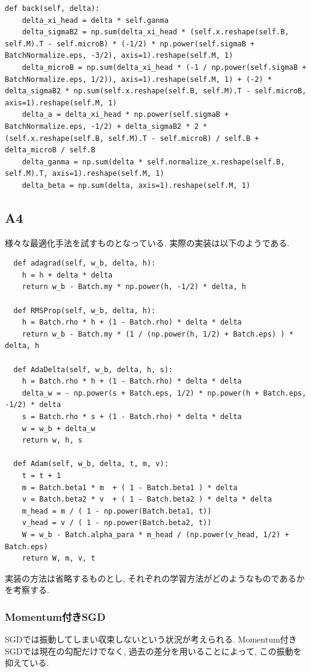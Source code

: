 \documentclass[a4paper,11pt]{jsarticle}
\begin{document}
\begin{lstlisting}[caption=Batch-Normalization-back]
  def back(self, delta):
    delta_xi_head = delta * self.ganma
    delta_sigmaB2 = np.sum(delta_xi_head * (self.x.reshape(self.B, self.M).T - self.microB) * (-1/2) * np.power(self.sigmaB + BatchNormalize.eps, -3/2), axis=1).reshape(self.M, 1)
    delta_microB = np.sum(delta_xi_head * (-1 / np.power(self.sigmaB + BatchNormalize.eps, 1/2)), axis=1).reshape(self.M, 1) + (-2) * delta_sigmaB2 * np.sum(self.x.reshape(self.B, self.M).T - self.microB, axis=1).reshape(self.M, 1)
    delta_a = delta_xi_head * np.power(self.sigmaB + BatchNormalize.eps, -1/2) + delta_sigmaB2 * 2 * (self.x.reshape(self.B, self.M).T - self.microB) / self.B + delta_microB / self.B
    delta_ganma = np.sum(delta * self.normalize_x.reshape(self.B, self.M).T, axis=1).reshape(self.M, 1)
    delta_beta = np.sum(delta, axis=1).reshape(self.M, 1)
\end{lstlisting}

\subsection{A4}
様々な最適化手法を試すものとなっている. 実際の実装は以下のようである.
\begin{lstlisting}
  def adagrad(self, w_b, delta, h):
    h = h + delta * delta
    return w_b - Batch.my * np.power(h, -1/2) * delta, h

  def RMSProp(self, w_b, delta, h):
    h = Batch.rho * h + (1 - Batch.rho) * delta * delta
    return w_b - Batch.my * (1 / (np.power(h, 1/2) + Batch.eps) ) * delta, h

  def AdaDelta(self, w_b, delta, h, s):
    h = Batch.rho * h + (1 - Batch.rho) * delta * delta
    delta_w = - np.power(s + Batch.eps, 1/2) * np.power(h + Batch.eps, -1/2) * delta
    s = Batch.rho * s + (1 - Batch.rho) * delta * delta
    w = w_b + delta_w
    return w, h, s

  def Adam(self, w_b, delta, t, m, v):
    t = t + 1
    m = Batch.beta1 * m  + ( 1 - Batch.beta1 ) * delta
    v = Batch.beta2 * v  + ( 1 - Batch.beta2 ) * delta * delta
    m_head = m / ( 1 - np.power(Batch.beta1, t))
    v_head = v / ( 1 - np.power(Batch.beta2, t))
    W = w_b - Batch.alpha_para * m_head / (np.power(v_head, 1/2) + Batch.eps)
    return W, m, v, t
\end{lstlisting}
実装の方法は省略するものとし, それぞれの学習方法がどのようなものであるかを考察する.

\subsubsection*{Momentum付きSGD}
SGDでは振動してしまい収束しないという状況が考えられる.
Momentum付きSGDでは現在の勾配だけでなく, 過去の差分を用いることによって,
この振動を抑えている.
\end{document}
